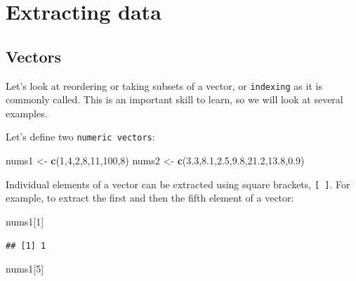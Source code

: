 \documentclass[]{book}
\newenvironment{Shaded}{\begin{snugshade}}{\end{snugshade}}
\newcommand{\DecValTok}[1]{\textcolor[rgb]{0.00,0.00,0.81}{#1}}
\newcommand{\FloatTok}[1]{\textcolor[rgb]{0.00,0.00,0.81}{#1}}
\newcommand{\KeywordTok}[1]{\textcolor[rgb]{0.13,0.29,0.53}{\textbf{#1}}}
\newcommand{\NormalTok}[1]{#1}
\newcommand{\StringTok}[1]{\textcolor[rgb]{0.31,0.60,0.02}{#1}}
\begin{document}
\hypertarget{extracting-data}{%
\section{Extracting data}\label{extracting-data}}

\hypertarget{vectorindexing}{%
\subsection{Vectors}\label{vectorindexing}}

Let's look at reordering or taking subsets of a vector, or \texttt{indexing} as it is commonly called. This is an important skill to learn, so we will look at several examples.

Let's define two \texttt{numeric\ vectors}:

\begin{Shaded}
\begin{Highlighting}[]
\NormalTok{nums1 <-}\StringTok{ }\KeywordTok{c}\NormalTok{(}\DecValTok{1}\NormalTok{,}\DecValTok{4}\NormalTok{,}\DecValTok{2}\NormalTok{,}\DecValTok{8}\NormalTok{,}\DecValTok{11}\NormalTok{,}\DecValTok{100}\NormalTok{,}\DecValTok{8}\NormalTok{)}
\NormalTok{nums2 <-}\StringTok{ }\KeywordTok{c}\NormalTok{(}\FloatTok{3.3}\NormalTok{,}\FloatTok{8.1}\NormalTok{,}\FloatTok{2.5}\NormalTok{,}\FloatTok{9.8}\NormalTok{,}\FloatTok{21.2}\NormalTok{,}\FloatTok{13.8}\NormalTok{,}\FloatTok{0.9}\NormalTok{)}
\end{Highlighting}
\end{Shaded}

Individual elements of a vector can be extracted using square brackets, \texttt{{[}\ {]}}. For example, to extract the first and then the fifth element of a vector:

\begin{Shaded}
\begin{Highlighting}[]
\NormalTok{nums1[}\DecValTok{1}\NormalTok{]}
\end{Highlighting}
\end{Shaded}

\begin{verbatim}
## [1] 1
\end{verbatim}

\begin{Shaded}
\begin{Highlighting}[]
\NormalTok{nums1[}\DecValTok{5}\NormalTok{]}
\end{Highlighting}
\end{Shaded}
\end{document}
